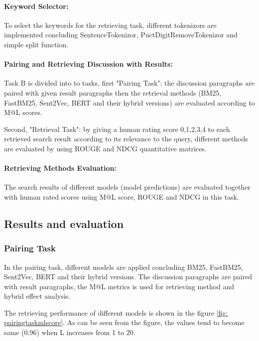 \documentclass[10pt,a4paper,fleqn]{report}
\begin{document}
		\paragraph{Keyword Selector:}
			
			To select the keywords for the retrieving task, different tokenizors are implemented concluding SentenceTokenizor, PuctDigitRemoveTokenizor and simple split function.
		
		\paragraph{Pairing and Retrieving Discussion with Results:}
			
			Task B is divided into to tasks, first "Pairing Task": the discussion paragraphs are paired with given result paragraphs then the retrieval methods (BM25, FastBM25, Sent2Vec, BERT and their hybrid versions) are evaluated according to M@L scores.
			
			Second, "Retrieval Task": by giving a human rating score {0,1,2,3,4} to each retrieved search result according to its relevance to the query, different methods are evaluated by using ROUGE and NDCG quantitative matrices.
		
		\paragraph{Retrieving Methods Evaluation:}
			
			The search results of different models (model predictions) are evaluated together with human rated scores using M@L score, ROUGE and NDCG in this task.
	

	\subsection{Results and evaluation}			
		
		\subsubsection{Pairing Task} %
			
			In the pairing task, different models are applied concluding BM25, FastBM25, Sent2Vec, BERT and their hybrid versions.
			The discussion paragraphs are paired with result paragraphs, the M@L metrics is used for retrieving method and hybrid effect analysis.
			
			The retrieving performance of different models is shown in the figure \ref{fig: pairingtaskmlscore}. As can be seen from the figure, the values tend to become same (0.96) when L increases from 1 to 20.
			
\end{document}
